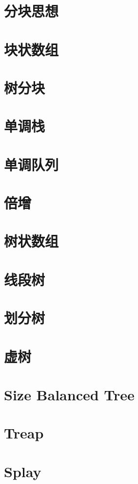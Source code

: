   \section{分块思想}
  
  
  \section{块状数组}
  
  \section{树分块}
  
\section{单调栈}

\section{单调队列}

\section{倍增}

\section{树状数组}

\section{线段树}

\section{划分树}

\section{虚树}

\section{Size Balanced Tree}

\section{Treap}

\section{Splay}

